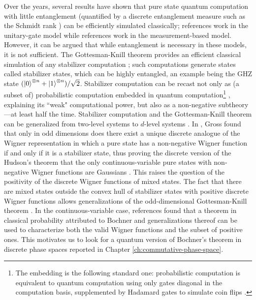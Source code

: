 Over the years, several results have shown that pure state quantum computation with little entanglement (quantified by a discrete entanglement measure such as the Schmidt rank \cite{van_den_nest_universal_2013}) can be efficiently simulated classically; references \cite{jozsa_role_2003,vidal_efficient_2003,yoran_classical_2006,jozsa_simulation_2006} work in the unitary-gate model while references \cite{markov_simulating_2008,shi_classical_2006,van_den_nest_classical_2007} work in the measurement-based model. However, it can be argued that while entanglement is necessary in these models, it is not sufficient. The Gottesman-Knill theorem provides an efficient classical simulation of any stabilizer computation \cite{gottesman_stabilizer_1997,nielsen2000quantum}; such computations generate states called stabilizer states, which can be highly entangled, an example being the GHZ state $({\left\vert{0}\right\rangle}^{\otimes n} + {\left\vert{1}\right\rangle}^{\otimes n})/\sqrt2$. Stabilizer computation can be recast not only as (a subset of) probabilistic computation embedded in quantum computation\footnote{The embedding is the following standard one: probabilistic computation is equivalent to quantum computation using only gates diagonal in the computation basis, supplemented by Hadamard gates to simulate coin flips \cite{nielsen2000quantum}.} \cite{nest_classical_2008}, explaining its ``weak" computational power, but also as a non-negative subtheory---at least half the time. Stabilizer computation and the Gottesman-Knill theorem can be generalized from two-level systems to $d$-level systems \cite{gottesman_fault-tolerant_1999}. In \cite{gross_hudsons_2006}, Gross found that only in odd dimensions does there exist a unique discrete analogue of the Wigner representation in which a pure state has a non-negative Wigner function if and only if it is a  stabilizer state, thus proving the discrete version of the Hudson's theorem that the only continuous-variable pure states with non-negative Wigner functions are Gaussians \cite{hudson_when_1974}. This raises the question of the positivity of the discrete Wigner functions of mixed states. The fact that there are mixed states outside the convex hull of stabilizer states with positive discrete Wigner functions allows generalizations of the odd-dimensional Gottesman-Knill theorem \cite{mari_positive_2012,veitch_negative_2012}. In the continuous-variable case, references \cite{srinivas_nonclassical_1975,brocker_mixed_1995} found that a theorem in classical probability attributed to Bochner \cite{bochner_monotone_1933} and generalizations thereof can be used to characterize both the valid Wigner functions and the subset of positive ones. This motivates us to look for a quantum version of Bochner's theorem in discrete phase spaces reported in Chapter \ref{ch:commutative-phase-space}.

